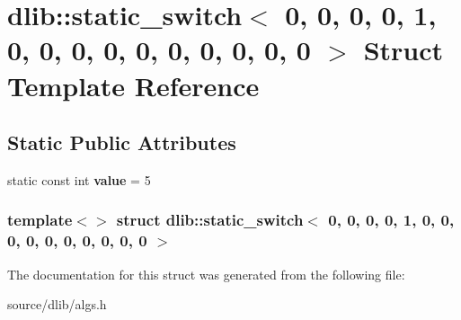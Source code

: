 \hypertarget{structdlib_1_1static__switch_3_010_00_010_00_010_00_010_00_011_00_010_00_010_00_010_00_010_00_01ff4b50cffbfc7efeb2ebcd8ac49664ca}{
\section{dlib::static\_\-switch$<$ 0, 0, 0, 0, 1, 0, 0, 0, 0, 0, 0, 0, 0, 0, 0 $>$ Struct Template Reference}
\label{structdlib_1_1static__switch_3_010_00_010_00_010_00_010_00_011_00_010_00_010_00_010_00_010_00_01ff4b50cffbfc7efeb2ebcd8ac49664ca}
}
\subsection*{Static Public Attributes}
\begin{DoxyCompactItemize}
\item 
\hypertarget{structdlib_1_1static__switch_3_010_00_010_00_010_00_010_00_011_00_010_00_010_00_010_00_010_00_01ff4b50cffbfc7efeb2ebcd8ac49664ca_adce77c801132c83207d4c40b795a3bad}{
static const int {\bfseries value} = 5}
\label{structdlib_1_1static__switch_3_010_00_010_00_010_00_010_00_011_00_010_00_010_00_010_00_010_00_01ff4b50cffbfc7efeb2ebcd8ac49664ca_adce77c801132c83207d4c40b795a3bad}

\end{DoxyCompactItemize}
\subsubsection*{template$<$$>$ struct dlib::static\_\-switch$<$ 0, 0, 0, 0, 1, 0, 0, 0, 0, 0, 0, 0, 0, 0, 0 $>$}



The documentation for this struct was generated from the following file:\begin{DoxyCompactItemize}
\item 
source/dlib/algs.h\end{DoxyCompactItemize}
